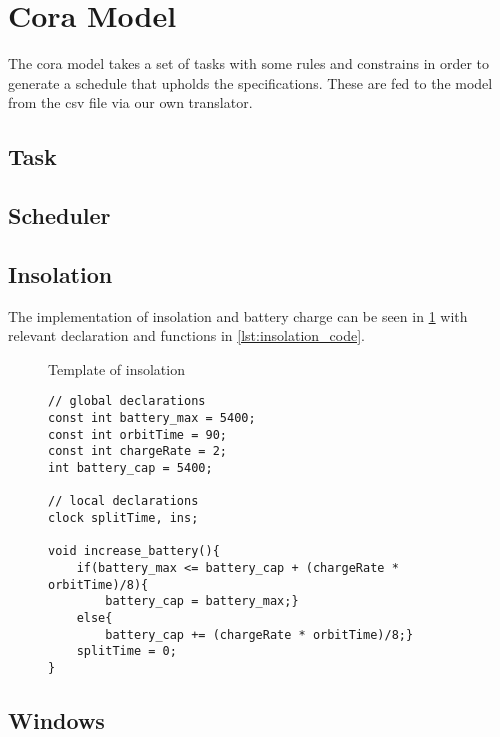 \section{Cora Model} \label{sec:cora}
The \gls{cora} model takes a set of tasks with some rules and constrains in order to generate a schedule that upholds the specifications. These are fed to the model from the csv file via our own translator.


\subsection*{Task}
\subsection*{Scheduler}
\subsection*{Insolation}
The implementation of insolation and battery charge can be seen in \cref{fig:cora_inso} with relevant declaration and functions in \cref{lst:insolation_code}.

\begin{figure}
	\centering
	\caption{Template of insolation}
	\label{fig:cora_inso}
\end{figure}

\begin{figure}
	\begin{lstlisting}[language=my_c, caption={Declarations and function}, label=lst:insolation_code]
// global declarations
const int battery_max = 5400;
const int orbitTime = 90;
const int chargeRate = 2;
int battery_cap = 5400;

// local declarations
clock splitTime, ins;

void increase_battery(){
	if(battery_max <= battery_cap + (chargeRate * orbitTime)/8){
		battery_cap = battery_max;}
	else{
		battery_cap += (chargeRate * orbitTime)/8;}
	splitTime = 0;
}
	\end{lstlisting}
\end{figure}


\subsection*{Windows}

